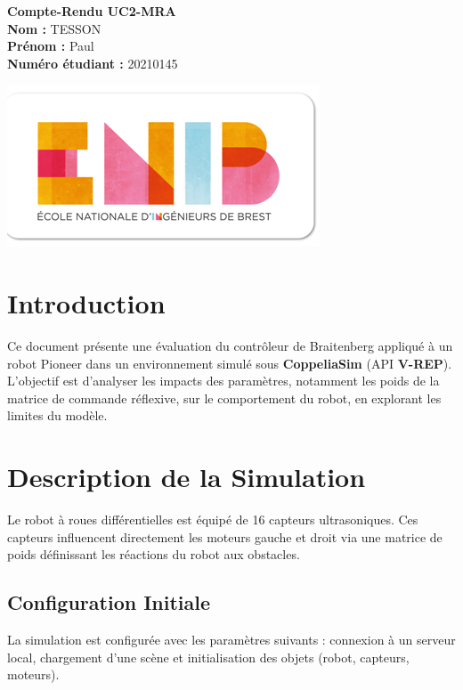 \documentclass{article}
\begin{document}
\begin{minipage}{0.5\textwidth}
  \centering
  \Large \textbf{Compte-Rendu UC2-MRA} \\
  \vspace{0.5cm}
  \large \textbf{Nom :} TESSON \\
  \textbf{Prénom :} Paul \\
  \textbf{Numéro étudiant :} 20210145
\end{minipage}
\hfill
\begin{minipage}{0.45\textwidth}
  \centering
  \includegraphics[width=0.8\linewidth]{Logo_ENIB_2012.png}
\end{minipage}

\section*{Introduction}
Ce document présente une évaluation du contrôleur de Braitenberg appliqué à un robot Pioneer dans un environnement simulé sous \textbf{CoppeliaSim} (API \textbf{V-REP}). L'objectif est d'analyser les impacts des paramètres, notamment les poids de la matrice de commande réflexive, sur le comportement du robot, en explorant les limites du modèle.

\section*{Description de la Simulation}
Le robot à roues différentielles est équipé de 16 capteurs ultrasoniques. Ces capteurs influencent directement les moteurs gauche et droit via une matrice de poids définissant les réactions du robot aux obstacles.

\subsection*{Configuration Initiale}
La simulation est configurée avec les paramètres suivants : connexion à un serveur local, chargement d'une scène et initialisation des objets (robot, capteurs, moteurs).
\end{document}
